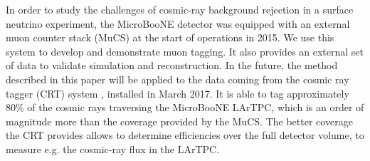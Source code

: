\documentclass[a4paper,11pt]{article}
\begin{document}
In order to study the challenges of cosmic-ray background rejection in a surface neutrino experiment, the MicroBooNE detector was equipped with an external muon counter stack (MuCS) at the start of operations in 2015. We use this system to develop and demonstrate muon tagging. It also provides an external set of data to validate simulation and reconstruction.
In the future, the method described in this paper will be applied to the data coming from the cosmic ray tagger (CRT) system \cite{crt}, installed in March 2017. It is able to tag approximately $80\%$ of the cosmic rays traversing the MicroBooNE LArTPC, which is an order of magnitude more than the coverage provided by the MuCS. The better coverage the CRT provides allows to determine efficiencies over the full detector volume, to measure e.g. the cosmic-ray flux in the LArTPC. %


\end{document}
